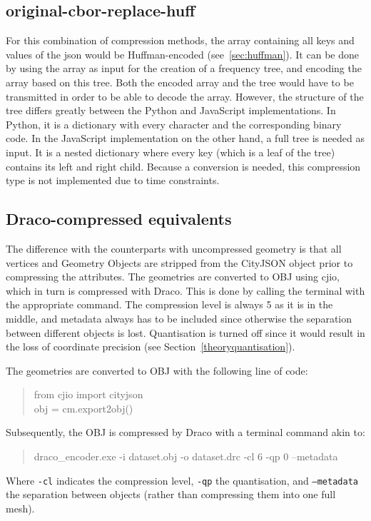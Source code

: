\subsection{original-cbor-replace-huff}
For this combination of compression methods, the array containing all keys and values of the \ac{json} would be Huffman-encoded (see~\ref{sec:huffman}).
It can be done by using the array as input for the creation of a frequency tree, and encoding the array based on this tree.
Both the encoded array and the tree would have to be transmitted in order to be able to decode the array.
However, the structure of the tree differs greatly between the Python and JavaScript implementations.
In Python, it is a dictionary with every character and the corresponding binary code.
In the JavaScript implementation on the other hand, a full tree is needed as input.
It is a nested dictionary where every key (which is a leaf of the tree) contains its left and right child.
Because a conversion is needed, this compression type is not implemented due to time constraints.

\subsection{Draco-compressed equivalents}
\label{sec:dracocompressiontypes}
The difference with the counterparts with uncompressed geometry is that all vertices and Geometry Objects are stripped from the CityJSON object prior to compressing the attributes.
The geometries are converted to OBJ using cjio, which in turn is compressed with Draco.
This is done by calling the terminal with the appropriate command.
The compression level is always 5 as it is in the middle, and metadata always has to be included since otherwise the separation between different objects is lost.
Quantisation is turned off since it would result in the loss of coordinate precision (see Section~\ref{theoryquantisation}).

The geometries are converted to OBJ with the following line of code:
\blockquote{from cjio import cityjson\\
obj = cm.export2obj()}

Subsequently, the OBJ is compressed by Draco with a terminal command akin to:
\blockquote{draco\_encoder.exe -i dataset.obj -o dataset.drc -cl 6 -qp 0 --metadata}

Where \texttt{-cl} indicates the compression level, \texttt{-qp} the quantisation, and \texttt{--metadata} the separation between objects (rather than compressing them into one full mesh).

